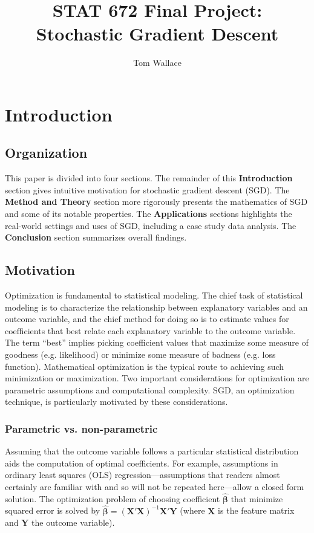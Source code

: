 \documentclass{article}
\author{Tom Wallace}
\title{STAT 672 Final Project:\\ Stochastic Gradient Descent}
\begin{document}
\maketitle

\section{Introduction}

\subsection{Organization}

This paper is divided into four sections. The remainder of this
\textbf{Introduction} section gives intuitive motivation for stochastic gradient
descent (SGD). The \textbf{Method and Theory} section more rigorously presents the
mathematics of SGD and some of its notable properties. The
\textbf{Applications} sections highlights the real-world settings and uses of SGD,
including a case study data analysis. The \textbf{Conclusion} section summarizes
overall findings.

\subsection{Motivation}

Optimization is fundamental to statistical modeling. The chief task of
statistical modeling is to characterize the relationship between 
explanatory variables and an outcome variable, and the chief method for doing so
is to estimate values for coefficients that best relate
each explanatory variable to the outcome variable. The term ``best''
implies picking coefficient values that
maximize some measure of goodness (e.g. likelihood) or minimize some measure of
badness (e.g. loss function). 
Mathematical optimization is the typical
route to achieving such minimization or maximization. Two important
considerations for optimization are parametric assumptions and computational
complexity. SGD, an optimization technique, is
particularly motivated by these considerations.

\subsubsection{Parametric vs. non-parametric}

Assuming that the outcome variable follows a
particular statistical distribution aids the computation of optimal coefficients. 
For example, assumptions in ordinary least squares (OLS)
regression---assumptions that readers almost certainly are familiar with and so will not be
repeated here---allow a closed form solution. The optimization problem of
choosing coefficient $\hat{\bm{\beta}}$ that minimize squared error is solved
by $\hat{\bm{\beta}} = (\bm{X}'\bm{X})^{-1}\bm{X}'\bm{Y}$ (where $\bm{X}$ is the
feature matrix and $\bm{Y}$ the outcome variable).
\end{document}
